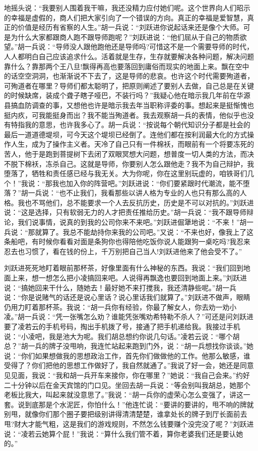 \documentclass[12pt,oneside]{book}
\begin{document}
地摇头说：``我要别人围着我干嘛，我还没精力应付她们呢。这个世界向人们昭示的幸福是虚假的，商人们把大家引向了一个错误的方向。真正的幸福是爱智慧，真正的价值是经历有省察的人生。''胡一兵说：``刘跃进你说起话来还是像个大师。可是为什么大家都跟商人跑不跟导师跑呢？''刘跃进说：``他们屈从于自己的物质欲望。''胡一兵说：``导师没人跟他跑他还是导师吗?可惜这不是一个需要导师的时代，人人都明白自己应该追求什么。活着就是生存，生存就要解决各种问题，解决问题靠什么？靠那两个王八旦!飘得再高也要落回到庸俗而现实的地面上来。飘在空中的话空空洞洞，也渐渐说不下去了，这是导师的悲哀。也许这个时代需要殉道者，可殉道者在哪里？导师们都太聪明了，把原则阐述了要别人去做，自己总是在关键的时候缺席，装成个聋子瞎子哑巴，不装行吗？''我疑心他在暗示我几年前在华源县搞血防调查的事，又想他也许是暗示我去年当职称评委的事。想起来是挺惭愧也挺内疚，可我能挺身而出？我不能当殉道者。我去观察胡一兵的表情，他似乎也没有特指我的意思，也许我多心了。胡一兵说：``按说每个朝代知识分子都是社会的最后一道道德堤坝，可今天这个堤坝已经倒了。连他们都在按利润最大化的方式操作人生，成为了操作主义者。天冷了自己只有一件棉袄，而眼前有一个将要冻死的苦人，他于是跑到菩提树下去闭了双眼冥想大问题，想普度一切人类的方法，而决不脱下棉袄，冻杀自己。这就是导师，你要别人怎么跟他走？我不为自己辩护，我堕落了，牺牲和责任感已经与我无关。大为你呢，你在这里别玩虚的，咱铁哥们几个！''我说：``那我也加入你的阵营吧。''刘跃进说：``你们要紧跟时代潮流，能不堕落？''胡一兵说：``也不止我们，我看那些以讲人格为专业的人也只有那么高的人格。我也不骂他们，总不能要求一个人去反抗历史，历史是不可以对抗的。''刘跃进说：``这是选择，只有软弱无力的人才把责任推给历史。''胡一兵说：``我不跟导师辩论，我们说事情，说真的到我的公司你来不来吧。''刘跃进倔犟地说：``不来！''胡一兵说：``那就算了。我总不能劫持你来我的公司吧。''又说：``不来也好，像我上了这条船吧，有时候你看看对面是条狗你也得陪他吃饭你说人能跟狗一桌吃吗?我忍来忍去也习惯了，看在钱的份上，千万别把自己当人!刘跃进他来了他会受不了。''

刘跃进死死地盯着眼前那杯茶，好像里面有什么神秘的东西。我说：``我们回到地面上来，想一想怎么把小凌搞回来吧。人说得再飘逸也要回到地面上来。''刘跃进说：``搞她回来干什么，随她去！最好她不来打搅我，我还清静些呢。''胡一兵说：``你是说赌气的话还是说心里话？说心里话我们就算了。''刘跃进不做声，眼睛仍用力盯着那杯茶。我说：``胡一兵你有经验，你最了解女人，你去劝一劝小凌。''胡一兵说：``凭一张嘴怎么劝？谁能凭张嘴劝希特勒不杀人？''可还是问刘跃进要了凌若云的手机号码，掏出手机拨了号，接通了把手机递给我。我接过手机说：``小凌吧，我是池大为呢。我们胡总想约你说几句话。''凌若云说：``哪个胡总？''胡一兵的牌子没甩响，我连忙站起来跑到门外，说：``胡一兵想找你谈谈。''她说：``你们如果想做我的思想政治工作，首先你们做做他的工作。他那么敏感，谁受得了？你们把他的思想工作做好了，我自然就通了。''我说了好一会，她还是同意见见面，我说：``我和胡一兵开车来接你，你在哪里？''她说：``我自己会来。''约好二十分钟以后在金天宾馆的门口见。坐回去胡一兵说：``等会别叫我胡总，她那个老板比我大，叫起来就没意思了。''我说：``胡一兵你的虚荣心怎么变强了，讲这一套。说到底那是个水泥匠，你怕什么！''他连忙说：``要讲的要讲的，甩不响的牌就别甩，就像你们那个圈子要把级别讲得清清楚楚，谁拿处长的牌子到厅长面前去甩?财大才能气粗，这是我们的游戏规则，不然怎么钱要赚个没完没了呢？''刘跃进说：``凌若云她算个屁！''我说：``算什么我们管不着，算你老婆我们还是要认她的。''
\end{document}
